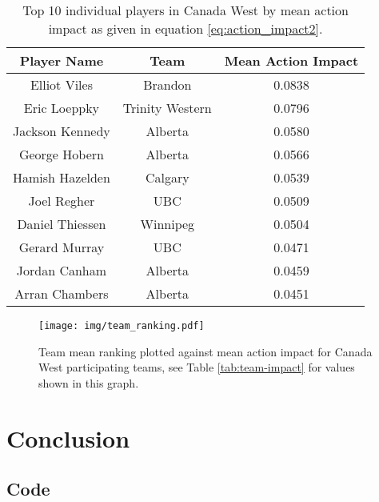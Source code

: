 \documentclass{sfuthesis}
\begin{document}
	\begin{table}
		\centering
		\begin{tabular}{ccc}
			\textbf{Player Name} & \textbf{Team}   & \textbf{Mean Action Impact} \\ \hline
			Elliot Viles         & Brandon         & 0.0838                      \\
			Eric Loeppky         & Trinity Western & 0.0796                      \\
			Jackson Kennedy      & Alberta         & 0.0580                      \\
			George Hobern        & Alberta         & 0.0566                      \\
			Hamish Hazelden      & Calgary         & 0.0539                      \\
			Joel Regher          & UBC             & 0.0509                      \\
			Daniel Thiessen      & Winnipeg        & 0.0504                      \\
			Gerard Murray        & UBC             & 0.0471                      \\
			Jordan Canham        & Alberta         & 0.0459                      \\
			Arran Chambers       & Alberta         & 0.0451                     
		\end{tabular}
		\caption{Top 10 individual players in Canada West by mean action impact as given in equation \eqref{eq:action_impact2}.}
		\label{tab:player-impact}
	\end{table}
	
	\begin{figure}
		\texttt{[image: img/team\_ranking.pdf]}
		\caption{Team mean ranking plotted against mean action impact for Canada West participating teams, see Table \ref{tab:team-impact} for values shown in this graph.}
		\label{fig:team-impact}
	\end{figure}

	\chapter{Conclusion}
		
	
	
	\backmatter%
	
	
	
	\begin{appendices} %
		\chapter{Code}
	\end{appendices}
\end{document}
